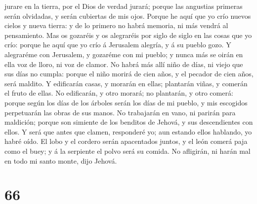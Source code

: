 jurare en la tierra, por el Dios de verdad jurará; porque las angustias
primeras serán olvidadas, y serán cubiertas de mis ojos. 
Porque he aquí que yo crío nuevos cielos y nueva tierra: y de lo primero
no habrá memoria, ni más vendrá al pensamiento.  Mas os
gozaréis y os alegraréis por siglo de siglo en las cosas que yo crío:
porque he aquí que yo crío á Jerusalem alegría, y á su pueblo gozo.
 Y alegraréme con Jerusalem, y gozaréme con mi pueblo; y
nunca más se oirán en ella voz de lloro, ni voz de clamor.
 No habrá más allí niño de días, ni viejo que sus días no
cumpla: porque el niño morirá de cien años, y el pecador de cien años,
será maldito.  Y edificarán casas, y morarán en ellas;
plantarán viñas, y comerán el fruto de ellas.  No
edificarán, y otro morará; no plantarán, y otro comerá: porque según los
días de los árboles serán los días de mi pueblo, y mis escogidos
perpetuarán las obras de sus manos.  No trabajarán en
vano, ni parirán para maldición; porque son simiente de los benditos de
Jehová, y sus descendientes con ellos.  Y será que antes
que clamen, responderé yo; aun estando ellos hablando, yo habré oído.
 El lobo y el cordero serán apacentados juntos, y el león
comerá paja como el buey; y á la serpiente el polvo será su comida. No
afligirán, ni harán mal en todo mi santo monte, dijo Jehová.

\hypertarget{section-65}{%
\section{66}\label{section-65}}

